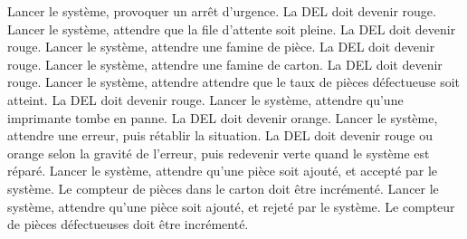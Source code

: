 {Lancer le système, provoquer un arrêt d'urgence}.
{La DEL doit devenir rouge.}
{Lancer le système, attendre que la file d'attente soit pleine.}
{La DEL doit devenir rouge.}
{Lancer le système, attendre une famine de pièce.}
{La DEL doit devenir rouge.}
{Lancer le système, attendre une famine de carton.}
{La DEL doit devenir rouge.}
{Lancer le système, attendre attendre que le taux de pièces défectueuse soit
atteint.}
{La DEL doit devenir rouge.}
{Lancer le système, attendre qu'une imprimante tombe en panne.}
{La DEL doit devenir orange.}
{Lancer le système, attendre une erreur, puis rétablir la situation.}
{La DEL doit devenir rouge ou orange selon la gravité de l'erreur, puis
redevenir verte quand le système est réparé.}
{Lancer le système, attendre qu'une pièce soit ajouté, et accepté par le système.}
{Le compteur de pièces dans le carton doit être incrémenté.}
{Lancer le système, attendre qu'une pièce soit ajouté, et rejeté par le système.}
{Le compteur de pièces défectueuses doit être incrémenté.}
